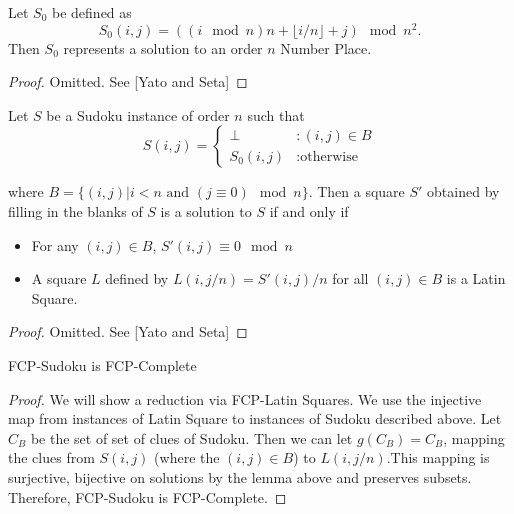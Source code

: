 \documentclass[runningheads,a4paper]{llncs}
\begin{document}
\begin{proposition}
Let $S_0$ be defined as
$$S_0 (i,j) = ((i \mod n) n + \lfloor i/n \rfloor + j) \mod n^2. $$
Then $S_0$ represents a solution to an order $n$ Number Place.
\end{proposition}

\begin{proof} 
Omitted. See [Yato and Seta] 
\end{proof}

\begin{lemma}
Let $S$ be a Sudoku instance of order $n$ such that
\begin{displaymath}
S(i,j) = \left\{
\begin{array}{lr}
\perp & : (i,j) \in B\\
S_0 (i,j) & : \text{otherwise}
\end{array}
\right.
\end{displaymath}

where $B = \{ (i,j) | i < n \text{ and } (j \equiv 0) \mod n \}$. Then a square $S'$ obtained by filling in the blanks of $S$ is a solution to $S$ if and only if

\begin{itemize}
\item For any $(i,j) \in B$, $S'(i,j) \equiv 0 \mod n$
\item A square $L$ defined by $L(i, j/n) = S'(i,j)/n$ for all $(i, j) \in B$ is a Latin Square.
\end{itemize}

\end{lemma}

\begin{proof} 
Omitted. See [Yato and Seta] 
\end{proof}

\begin{lemma} 
FCP-Sudoku is FCP-Complete
\end{lemma}

\begin{proof} 
We will show a reduction via FCP-Latin Squares. We use the injective map from instances of Latin Square to instances of Sudoku described above. Let $C_B$ be the set of set of clues of Sudoku. Then we can let $g(C_B)=C_B$, mapping the clues from $S(i,j)$ (where the $(i,j) \in B$) to $L(i, j/n)$.This mapping is surjective, bijective on solutions by the lemma above and preserves subsets. Therefore, FCP-Sudoku is FCP-Complete. 
\end{proof}
\end{document}
